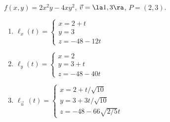 {$f(x,y) = 2x^2y-4xy^2$,  $\vec v = \la 1,3\ra$, $P=(2,3)$.\label{12_06_ex_05a}
}
{\begin{enumerate}
	\item $\ell_x(t) = \left\{\begin{array}{l} x=2+t\\ y=3 \\ z = -48-12t\end{array}\right.$
	
	\item $\ell_y(t) = \left\{\begin{array}{l} x=2\\ y=3+t \\ z = -48-40t\end{array}\right.$
	
	\item $\ell_{\vec u\,}(t) = \left\{\begin{array}{l} x=2+t/\sqrt{10}\\ y=3+3t/\sqrt{10} \\ z = -48-66\sqrt{2/5}t\end{array}\right.$
\end{enumerate}
}